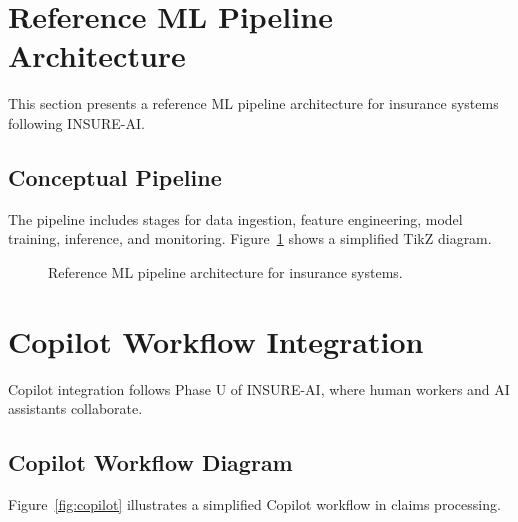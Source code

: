 \documentclass{article}
\begin{document}
\section{Reference ML Pipeline Architecture}
This section presents a reference ML pipeline architecture for insurance systems following INSURE-AI.

\subsection{Conceptual Pipeline}
The pipeline includes stages for data ingestion, feature engineering, model training, inference, and monitoring. Figure~\ref{fig:mlpipeline} shows a simplified TikZ diagram.

\begin{figure}[h]
\centering
{}
\caption{Reference ML pipeline architecture for insurance systems.}
\label{fig:mlpipeline}
\end{figure}

\section{Copilot Workflow Integration}
Copilot integration follows Phase U of INSURE-AI, where human workers and AI assistants collaborate.

\subsection{Copilot Workflow Diagram}
Figure~\ref{fig:copilot} illustrates a simplified Copilot workflow in claims processing.
\end{document}
